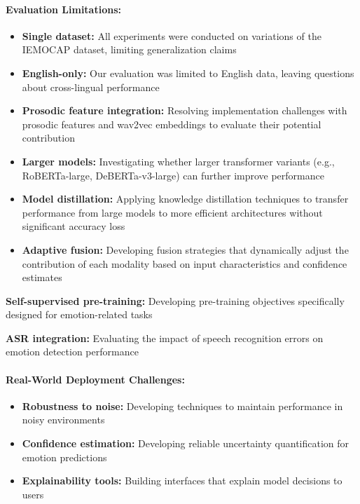 \documentclass[12pt]{article}
\begin{document}
\paragraph{Evaluation Limitations:}
\begin{itemize}
    \item \textbf{Single dataset:} All experiments were conducted on variations of the IEMOCAP dataset, limiting generalization claims

    \item \textbf{English-only:} Our evaluation was limited to English data, leaving questions about cross-lingual performance

    \item \textbf{Prosodic feature integration:} Resolving implementation challenges with prosodic features and wav2vec embeddings to evaluate their potential contribution

    \item \textbf{Larger models:} Investigating whether larger transformer variants (e.g., RoBERTa-large, DeBERTa-v3-large) can further improve performance

    \item \textbf{Model distillation:} Applying knowledge distillation techniques to transfer performance from large models to more efficient architectures without significant accuracy loss

    \item \textbf{Adaptive fusion:} Developing fusion strategies that dynamically adjust the contribution of each modality based on input characteristics and confidence estimates
\end{itemize}

    \item \textbf{Self-supervised pre-training:} Developing pre-training objectives specifically designed for emotion-related tasks

    \item \textbf{ASR integration:} Evaluating the impact of speech recognition errors on emotion detection performance

\paragraph{Real-World Deployment Challenges:}
\begin{itemize}
    \item \textbf{Robustness to noise:} Developing techniques to maintain performance in noisy environments

    \item \textbf{Confidence estimation:} Developing reliable uncertainty quantification for emotion predictions

    \item \textbf{Explainability tools:} Building interfaces that explain model decisions to users
\end{itemize}
\end{document}
